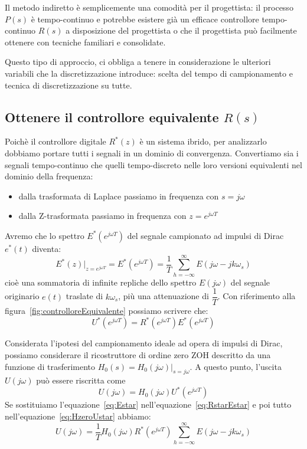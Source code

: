 \documentclass[a4paper]{report}
\begin{document}
Il metodo indiretto \`e semplicemente una comodit\`a per il
progettista: il processo $P(s)$ \`e tempo-continuo e potrebbe esistere
gi\`a un efficace controllore tempo-continuo $R(s)$ a disposizione del
progettista o che il progettista pu\`o facilmente ottenere con
tecniche familiari e consolidate.

Questo tipo di approccio, ci obbliga a tenere in considerazione le
ulteriori variabili che la discretizzazione introduce: scelta del
tempo di campionamento e tecnica di discretizzazione su tutte.

\subsection{Ottenere il controllore equivalente $R(s)$}
Poich\`e il controllore digitale $R^{*}(z)$ \`e un sistema ibrido, per
analizzarlo dobbiamo portare tutti i segnali in un dominio di
convergenza. Convertiamo sia i segnali tempo-continuo che quelli
tempo-discreto nelle loro versioni equivalenti nel dominio della
frequenza:
\begin{itemize}
\item dalla trasformata di Laplace passiamo in frequenza con $s =
  j\omega$
\item dalla Z-trasformata passiamo in frequenza con $z = e^{j \omega
  T}$
\end{itemize}
Avremo che lo spettro $E^{*}(e^{j \omega T})$ del segnale campionato
ad impulsi di Dirac $e^{*}(t)$ diventa:
\begin{equation}\label{eq:Estar}
  E^{*}(z)|_{z = e^{j \omega T}} = E^{*}(e^{j \omega T}) = \dfrac{1}{T}
  \sum_{h = -\infty}^{\infty} E(j \omega - j k \omega_s)
\end{equation}
cio\`e una sommatoria di infinite repliche dello spettro $E(j \omega)$
del segnale originario $e(t)$ traslate di $k\omega_s$, pi\`u una
attenuazione di $\dfrac{1}{T}$. Con riferimento alla
figura~\ref{fig:controlloreEquivalente} possiamo scrivere che:
\begin{equation}\label{eq:RstarEstar}
  U^{*}(e^{j \omega T}) = R^{*}(e^{j \omega T}) E^{*}(e^{j \omega T})
\end{equation}

Considerata l'ipotesi del campionamento ideale ad opera di impulsi di
Dirac, possiamo considerare il ricostruttore di ordine zero ZOH
descritto da una funzione di trasferimento $H_0(s) = H_0(j \omega)|_{s
= j \omega}$. A questo punto, l'uscita $U(j \omega)$ pu\`o essere
riscritta come
\begin{equation}\label{eq:HzeroUstar}
U(j\omega) = H_0(j \omega) U^{*}(e^{j \omega T})
\end{equation}
Se sostituiamo l'equazione~\ref{eq:Estar}
nell'equazione~\ref{eq:RstarEstar} e poi tutto
nell'equazione~\ref{eq:HzeroUstar} abbiamo:  
\begin{equation}
  U(j\omega) = \dfrac{1}{T} H_0(j \omega) R^{*}(e^{j \omega T})
  \sum_{h = -\infty}^{\infty} E(j \omega - j k \omega_s) 
\end{equation}
\end{document}
